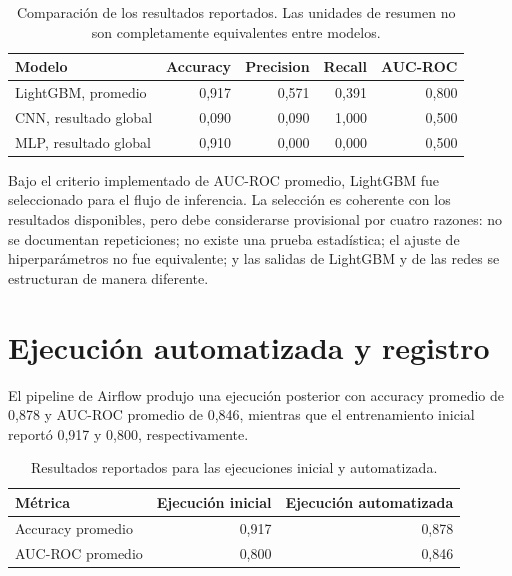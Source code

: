 \begin{table}[H]
    \centering
    \begin{tabular}{|l|r|r|r|r|}
    \hline
    \textbf{Modelo} & \textbf{Accuracy} & \textbf{Precision} & \textbf{Recall} & \textbf{AUC-ROC} \\
    \hline
    LightGBM, promedio & 0,917 & 0,571 & 0,391 & 0,800 \\
    \hline
    CNN, resultado global & 0,090 & 0,090 & 1,000 & 0,500 \\
    \hline
    MLP, resultado global & 0,910 & 0,000 & 0,000 & 0,500 \\
    \hline
    \end{tabular}
    \caption{Comparación de los resultados reportados. Las unidades de resumen no son completamente equivalentes entre modelos.}
    \label{tab:comparacion}
    \end{table}

Bajo el criterio implementado de AUC-ROC promedio, LightGBM fue seleccionado para el flujo de inferencia. La selección es coherente con los resultados disponibles, pero debe considerarse provisional por cuatro razones: no se documentan repeticiones; no existe una prueba estadística; el ajuste de hiperparámetros no fue equivalente; y las salidas de LightGBM y de las redes se estructuran de manera diferente.

\section{Ejecución automatizada y registro}

El pipeline de Airflow produjo una ejecución posterior con accuracy promedio de 0,878 y AUC-ROC promedio de 0,846, mientras que el entrenamiento inicial reportó 0,917 y 0,800, respectivamente.

\begin{table}[H]
    \centering
    \begin{tabular}{|l|r|r|}
    \hline
    \textbf{Métrica} & \textbf{Ejecución inicial} & \textbf{Ejecución automatizada} \\
    \hline
        Accuracy promedio & 0,917 & 0,878 \\
    \hline
        AUC-ROC promedio & 0,800 & 0,846 \\
    \hline
    \end{tabular}
    \caption{Resultados reportados para las ejecuciones inicial y automatizada.}
    \label{tab:inicial_vs_final}
\end{table}

